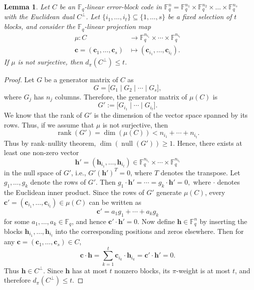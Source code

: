 \documentclass[11pt]{article}
\newtheorem{Definition and Notation}[Theorem]{Definition and Notation}
\newtheorem{Lemma}[Theorem]{Lemma}
\begin{document}
\begin{Lemma}\label{surjective}
Let $C$ be an $\mathbb F_q$-linear error-block code in $ \mathbb{F}_q^n =\mathbb{F}_q^{n_1}\times \mathbb{F}_q^{n_2} \times \ldots\times \mathbb{F}_q^{n_s}$ with the Euclidean dual $C^\perp$. Let $\{i_1,\ldots,i_t\}\subseteq\{1,\ldots,s\}$ be a fixed selection of $t$ blocks, and consider the $\mathbb F_q$-linear projection map
        \begin{align*}
         \mu : C &\to \mathbb{F}_{q}^{n_{i_1}} \times \cdots \times \mathbb{F}_{q}^{n_{i_t}}\\  
          \mathbf c=(\mathbf c_1,\ldots,\mathbf c_s)&\mapsto(\mathbf c_{i_1},\ldots,\mathbf c_{i_t}).
        \end{align*}
If $\mu$ is not surjective, then $d_\pi(C^\perp)\le t$.
\end{Lemma}
\begin{proof}
Let $ G $ be a generator matrix of $C$ as
$$
G = \Big[G_1 \mid G_2 \mid \cdots \mid G_s\Big],
$$
where $G_j$ has $n_j$ columns. Therefore, the generator matrix of $\mu(C)$ is 
$$
G':= \Big[G_{i_1} \mid \cdots \mid G_{i_t}\Big].
$$
We know that the rank of $G'$ is the dimension of the vector space spanned by its rows. Thus, if we assume that $\mu$ is not surjective, then 
$$\operatorname{rank}(G')=\dim(\mu(C)) < n_{i_1} + \cdots + n_{i_t}.$$
Thus by rank–nullity theorem, $\dim(\operatorname{null}(G')) \ge 1$. Hence, there exists at least one non-zero vector
$$
\mathbf h'=(\mathbf h_{i_1},\ldots,\mathbf h_{i_t})\in\mathbb F_q^{n_{i_1}}\times\cdots\times\mathbb F_q^{n_{i_t}}
$$
in the null space of $G'$, i.e., $G'(\mathbf{h}')^T=0$, where $T$ denotes the transpose. Let $g_1,\ldots,g_k$ denote the rows of $G'$. Then $g_1\cdot\mathbf h'=\cdots=g_k\cdot\mathbf h'=0,$ where $\cdot$ denotes the Euclidean inner product. Since the rows of $G'$ generate $\mu(C)$, every
$\mathbf c'=(\mathbf c_{i_1},\ldots,\mathbf c_{i_t})\in\mu(C)$ can be written as
$$
\mathbf c'=a_1g_1+\cdots+a_kg_k
$$
for some $a_1,\ldots,a_k\in\mathbb F_q$, and hence $\mathbf c'\cdot\mathbf h'=0.$
Now define $\mathbf h\in\mathbb F_q^n$ by inserting the blocks
$\mathbf h_{i_1},\ldots,\mathbf h_{i_t}$ into the corresponding positions
and zeros elsewhere. Then for any $\mathbf c=(\mathbf c_1,\ldots,\mathbf c_s)\in C$,
$$
\mathbf c\cdot\mathbf h=\sum_{k=1}^t \mathbf c_{i_k}\cdot\mathbf h_{i_k}=\mathbf c'\cdot\mathbf h'=0.
$$
Thus $\mathbf h\in C^\perp$. Since $\mathbf h$ has at most $t$ nonzero blocks, its $\pi$-weight is at most $t$, and therefore $d_\pi(C^\perp)\le t.$
\end{proof}
\end{document}
